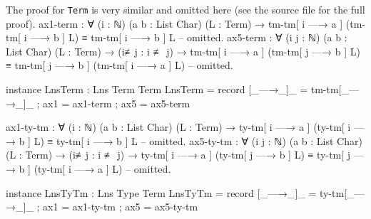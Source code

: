 \documentclass[logo,bsc,singlespacing,parskip,online]{infthesis}
\renewenvironment{code}{\mintedcopy[breaklines,breaksymbolleft=\;]{agda}}{\endmintedcopy}
\begin{document}
The proof for \texttt{Term} is very similar and omitted here (see the source file for the full proof).
\begin{code}
  ax1-term : ∀ (i : ℕ) (a b : List Char) (L : Term)
    → tm-tm[ i —→ a ] (tm-tm[ i —→ b ] L) ≡ tm-tm[ i —→ b ] L
  -- omitted.
  ax5-term : ∀ (i j : ℕ) (a b : List Char) (L : Term)
    → (i≢j : i ≢ j)
    → tm-tm[ i —→ a ] (tm-tm[ j —→ b ] L)
        ≡ tm-tm[ j —→ b ] (tm-tm[ i —→ a ] L)
  -- omitted.

  instance
    LnsTerm : Lns Term Term
    LnsTerm = record
      { [_—→_]_ = tm-tm[_—→_]_
      ; ax1 = ax1-term
      ; ax5 = ax5-term }

  ax1-ty-tm : ∀ (i : ℕ) (a b : List Char) (L : Term)
    → ty-tm[ i —→ a ] (ty-tm[ i —→ b ] L) ≡ ty-tm[ i —→ b ] L
  -- omitted.
  ax5-ty-tm : ∀ (i j : ℕ) (a b : List Char) (L : Term)
    → (i≢j : i ≢ j)
    → ty-tm[ i —→ a ] (ty-tm[ j —→ b ] L)
        ≡ ty-tm[ j —→ b ] (ty-tm[ i —→ a ] L)
  -- omitted.

  instance
    LnsTyTm : Lns Type Term
    LnsTyTm = record
      { [_—→_]_ = ty-tm[_—→_]_
      ; ax1 = ax1-ty-tm
      ; ax5 = ax5-ty-tm }
\end{code}
\end{document}
